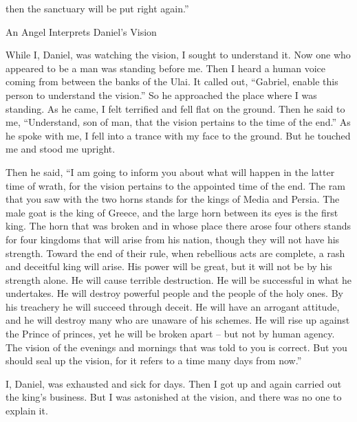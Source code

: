 {then the sanctuary will be put right again.”
\par }{\SH An Angel Interprets Daniel’s Vision
\par }{\PP {}While
I,
Daniel,
was watching
the vision,
I sought
to understand
it. Now
one who appeared
to be a man
was standing
before me.
Then
I heard
a human
voice
coming from between
the banks of the Ulai.
It called
out, “Gabriel,
enable this
person to understand
the vision.”
So
he approached
the place where I was standing.
As he came,
I felt terrified
and fell
flat on
the ground. Then he said
to me,
“Understand,
son
of man,
that
the vision
pertains
to the time
of the end.”
As he spoke
with
me, I fell into a trance
with my face
to the ground.
But he touched
me and stood me upright.
\par }{\PP {}Then he said,
“I am going
to inform you about
what will happen
in the latter
time of wrath,
for
the vision pertains
to the appointed
time of the end.
The ram
that
you saw
with the two horns
stands
for the kings
of Media
and Persia.
The male
goat
is the king
of Greece,
and the large
horn
between
its eyes
is
the first
king.
The horn that was broken
and in whose place
there arose
four
others stands
for four
kingdoms
that will arise from his nation,
though they will not
have his strength.
Toward the end
of their
rule,
when rebellious
acts are complete, a rash
and deceitful king
will arise.
His power
will be great, but it will not
be by his strength
alone.
He will cause terrible
destruction.
He will be successful
in what he
undertakes.
He will destroy
powerful
people and the people
of the holy ones.
By
his treachery
he will succeed
through deceit.
He will have an arrogant
attitude,
and he will destroy
many
who are unaware of his schemes.
He will rise up
against
the Prince
of princes,
yet he will be broken apart
– but not
by human agency.
The vision
of the evenings
and mornings
that
was told
to you
is correct.
But you should seal up the vision,
for
it refers
to a time
many days from now.”
\par }{\PP {}I,
Daniel,
was exhausted and sick
for days.
Then I got
up and again carried
out
the king’s
business.
But I was astonished at
the vision,
and there was no
one to explain it.


}
